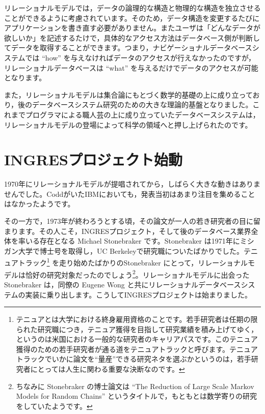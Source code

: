 リレーショナルモデルでは，データの論理的な構造と物理的な構造を独立させることができるように考慮されています。そのため，データ構造を変更するたびにアプリケーションを書き直す必要がありません。またユーザは「どんなデータが欲しいか」を記述するたけで，具体的なアクセス方法はデータベース側が判断してデータを取得することができます。つまり，ナビゲーショナルデータベースシステムでは ``how'' を与えなければデータのアクセスが行えなかったのですが，リレーショナルデータベースは ``what'' を与えるだけでデータのアクセスが可能となります。


また，リレーショナルモデルは集合論にもとづく数学的基礎の上に成り立っており，後のデータベースシステム研究のための大きな理論的基盤となりました。これまでプログラマによる職人芸の上に成り立っていたデータベースシステムは，リレーショナルモデルの登場によって科学の領域へと押し上げられたのです。


\section{INGRESプロジェクト始動}


1970年にリレーショナルモデルが提唱されてから，しばらく大きな動きはありませんでした。CoddがいたIBMにおいても，発表当初はあまり注目を集めることはなかったようです。

その一方で，1973年が終わろうとする頃，その論文が一人の若き研究者の目に留まります。その人こそ，INGRESプロジェクト，そして後のデータベース業界全体を率いる存在となる Michael Stonebraker です。Stonebraker は1971年にミシガン大学で博士号を取得し，UC Berkeleyで研究職についたばかりでした。テニュアトラック\footnote{テニュアとは大学における終身雇用資格のことです。若手研究者は任期の限られた研究職につき，テニュア獲得を目指して研究業績を積み上げてゆく，というのは米国における一般的な研究者のキャリアパスです。このテニュア獲得のための若手研究者が通る道をテニュアトラックと呼びます。テニュアトラックでいかに論文を``量産''できる研究ネタを選ぶかというのは，若手研究者にとっては人生に関わる重要な決断なのです。} を走り始めたばかりのStonebraker にとって，リレーショナルモデルは恰好の研究対象だったのでしょう\footnote{ちなみに Stonebraker の博士論文は ``The Reduction of Large Scale Markov Models for Random Chains'' というタイトルで，もともとは数学寄りの研究をしていたようです。 }。リレーショナルモデルに出会ったStonebraker は，同僚の Eugene Wong と共にリレーショナルデータベースシステムの実装に乗り出します。こうしてINGRESプロジェクトは始まりました。




